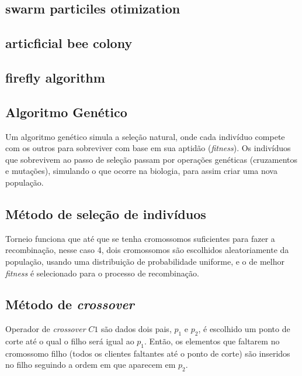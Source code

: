 \documentclass[12pt,a4paper]{article}
\begin{document}


\subsection{swarm particiles otimization}

\subsection{articficial bee colony}

\subsection{firefly algorithm}
\subsection{Algoritmo Genético}
\label{sec:alg_genetic}



Um algoritmo genético simula a seleção natural, onde cada indivíduo compete com os outros para sobreviver com base em sua aptidão (\emph{fitness}). Os indivíduos que sobrevivem ao passo de
seleção passam por operações genéticas (cruzamentos e mutações), simulando o que ocorre na biologia, para assim criar uma nova população.

    \subsection{Método de seleção de indivíduos}

        Torneio funciona que até que se tenha cromossomos suficientes para fazer a recombinação, nesse caso 4, dois cromossomos são escolhidos aleatoriamente da população, usando uma distribuição de
        probabilidade uniforme, e o de melhor \textit{fitness} é selecionado para o processo de recombinação.

    \subsection{Método de \textit{crossover}}

        Operador de \textit{crossover} $C1$ são dados dois pais, $p_1$ e $p_2$, é escolhido um ponto de corte até o qual o filho será igual ao $p_1$. Então, os elementos que faltarem no
        cromossomo filho (todos os clientes faltantes até o ponto de corte) são inseridos no filho seguindo a ordem em que aparecem em $p_2$. 
\end{document}
